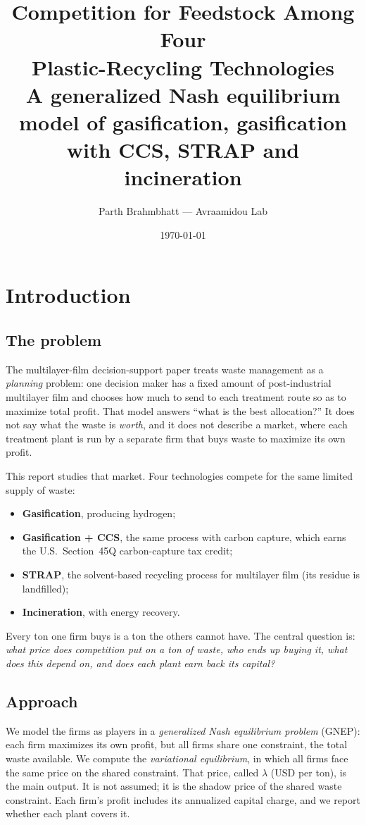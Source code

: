 \documentclass[11pt]{article}
\title{\textbf{Competition for Feedstock Among Four\\
Plastic-Recycling Technologies}\\[0.4em]
\large A generalized Nash equilibrium model of gasification, gasification with
CCS, STRAP and incineration}
\author{Parth Brahmbhatt --- Avraamidou Lab}
\date{\today}
\begin{document}
\maketitle

\section{Introduction}
\label{sec:intro}

\subsection{The problem}

The multilayer-film decision-support paper treats waste management as a
\emph{planning} problem: one decision maker has a fixed amount of post-industrial
multilayer film and chooses how much to send to each treatment route so as to
maximize total profit. That model answers ``what is the best allocation?'' It
does not say what the waste is \emph{worth}, and it does not describe a market,
where each treatment plant is run by a separate firm that buys waste to maximize
its own profit.

This report studies that market. Four technologies compete for the same limited
supply of waste:
\begin{itemize}[leftmargin=1.6em,itemsep=0.1em]
  \item \textbf{Gasification}, producing hydrogen;
  \item \textbf{Gasification + CCS}, the same process with carbon capture, which
        earns the U.S.\ Section~45Q carbon-capture tax credit;
  \item \textbf{STRAP}, the solvent-based recycling process for multilayer film
        (its residue is landfilled);
  \item \textbf{Incineration}, with energy recovery.
\end{itemize}
Every ton one firm buys is a ton the others cannot have. The central question is:
\emph{what price does competition put on a ton of waste, who ends up buying it, what
does this depend on, and does each plant earn back its capital?}

\subsection{Approach}

We model the firms as players in a \emph{generalized Nash equilibrium problem}
(GNEP): each firm maximizes its own profit, but all firms share one constraint, the
total waste available. We compute the \emph{variational equilibrium}, in which all
firms face the same price on the shared constraint. That price, called $\lambda$
(USD per ton), is the main output. It is not assumed; it is the shadow price of the
shared waste constraint. Each firm's profit includes its annualized capital charge,
and we report whether each plant covers it.
\end{document}
